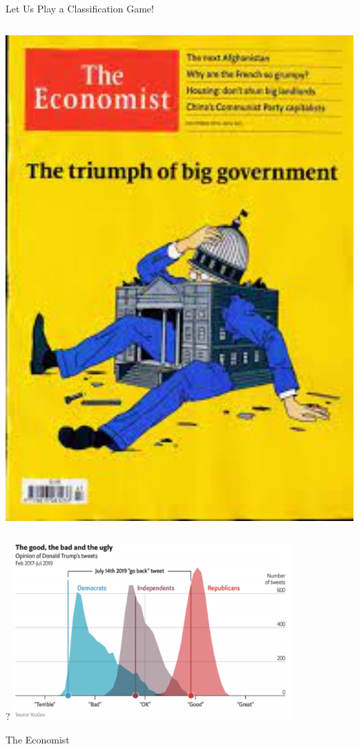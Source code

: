 \documentclass[notes, aspectratio=1610]{beamer}
\begin{document}
\begin{frame}{Let Us Play a Classification Game!}
\begin{columns}
\begin{column}{0.25\textwidth}
			\includegraphics[width=1\textwidth]{images/economist}
		\end{column}
	\end{columns}
\end{frame}

\begin{frame}{?}{}
	\centering
	\includegraphics[width=0.8\textwidth]{images/econ_0.png}
	\pause

	The Economist
\end{frame}
\end{document}
